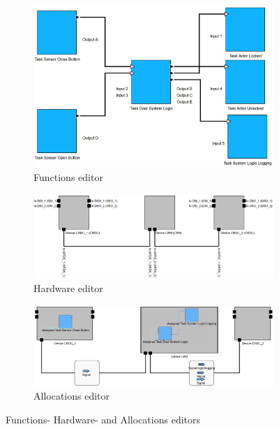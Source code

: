 \begin{figure}[h]
    \centering
    \begin{subfigure}{0.3\textwidth}
        \includegraphics[width=\linewidth]{Pictures/functions_editor.png}
        \caption{Functions editor}
        \label{fig_functions_editor_en}
    \end{subfigure}
    \hfill
    \begin{subfigure}{0.3\textwidth}
        \includegraphics[width=\linewidth]{Pictures/hardware_editor.png}
        \caption{Hardware editor}
        \label{fig_hardware_editor_en}
    \end{subfigure}
    \hfill
    \begin{subfigure}{0.3\textwidth}
        \includegraphics[width=\linewidth]{Pictures/allocations_editor.png}
        \caption{Allocations editor}
        \label{fig_allocations_editor_en}
    \end{subfigure}

    \caption{Functions- Hardware- and Allocations editors}
    \label{fig_editors_en}
\end{figure}
